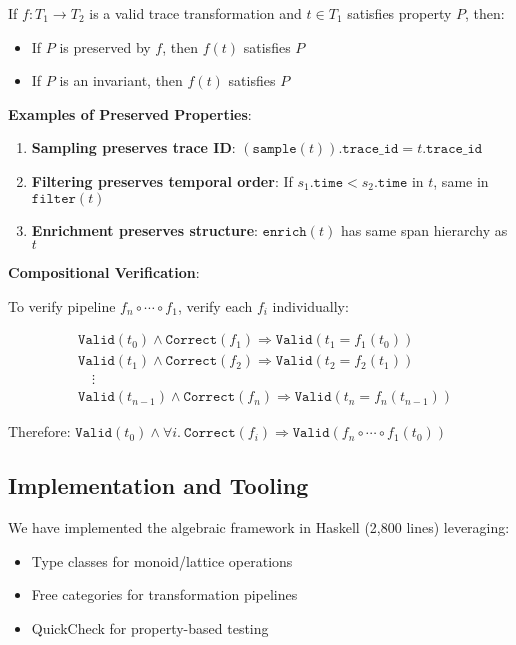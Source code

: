 \begin{theorem}
\label{thm:transformation}
If $f: T_1 \rightarrow T_2$ is a valid trace transformation and $t \in T_1$ satisfies property $P$, then:
\begin{itemize}
\item If $P$ is preserved by $f$, then $f(t)$ satisfies $P$
\item If $P$ is an invariant, then $f(t)$ satisfies $P$
\end{itemize}
\end{theorem}

\textbf{Examples of Preserved Properties}:

\begin{enumerate}
\item \textbf{Sampling preserves trace ID}: $(\texttt{sample}(t)).\texttt{trace\_id} = t.\texttt{trace\_id}$
\item \textbf{Filtering preserves temporal order}: If $s_1.\texttt{time} < s_2.\texttt{time}$ in $t$, same in $\texttt{filter}(t)$
\item \textbf{Enrichment preserves structure}: $\texttt{enrich}(t)$ has same span hierarchy as $t$
\end{enumerate}

\textbf{Compositional Verification}:

To verify pipeline $f_n \circ \cdots \circ f_1$, verify each $f_i$ individually:

\begin{align*}
&\texttt{Valid}(t_0) \land \texttt{Correct}(f_1) \Rightarrow \texttt{Valid}(t_1 = f_1(t_0)) \\
&\texttt{Valid}(t_1) \land \texttt{Correct}(f_2) \Rightarrow \texttt{Valid}(t_2 = f_2(t_1)) \\
&\quad\vdots \\
&\texttt{Valid}(t_{n-1}) \land \texttt{Correct}(f_n) \Rightarrow \texttt{Valid}(t_n = f_n(t_{n-1}))
\end{align*}

Therefore: $\texttt{Valid}(t_0) \land \forall i.\ \texttt{Correct}(f_i) \Rightarrow \texttt{Valid}(f_n \circ \cdots \circ f_1(t_0))$

\subsection{Implementation and Tooling}
\label{sec:algebraic-implementation}

We have implemented the algebraic framework in Haskell (2,800 lines) leveraging:
\begin{itemize}
\item Type classes for monoid/lattice operations
\item Free categories for transformation pipelines
\item QuickCheck for property-based testing
\end{itemize}

